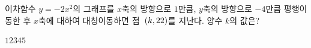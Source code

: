 이차함수 $y=-2x^2$의 그래프를 $x$축의 방향으로 $1$만큼, $y$축의 방향으로 $-4$만큼 평행이동한 후 $x$축에 대하여 대칭이동하면 점~$(k{,}\mkern3mu 22)$를 지난다. 양수 $k$의 값은?
\begin{choices32}{$1$}{$2$}{$3$}{$4$}{$5$}\end{choices32}

